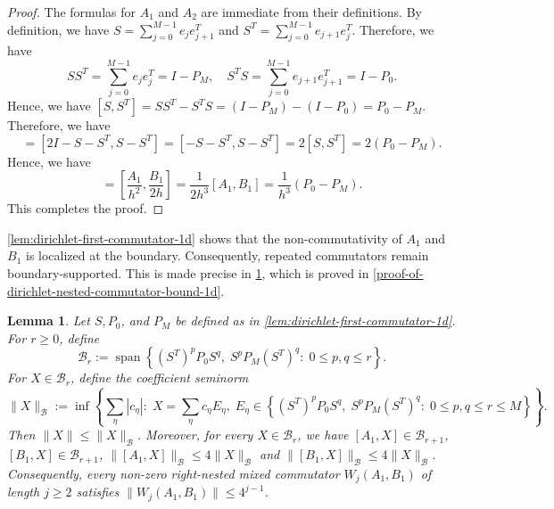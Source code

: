\documentclass[10pt,reqno]{article}
\numberwithin{equation}{section}
\theoremstyle{plain}
\newtheorem{lem}[thm]{Lemma}
\theoremstyle{definition}
\begin{document}
\begin{proof}
The formulas for \(A_1\) and \(A_2\) are immediate from their definitions. By definition, we have $S=\sum_{j=0}^{M-1}e_je_{j+1}^T$ and $S^T=\sum_{j=0}^{M-1}e_{j+1}e_j^T$. Therefore, we have
\begin{equation}
SS^T=\sum_{j=0}^{M-1}e_je_j^T=I-P_M, \quad S^TS=\sum_{j=0}^{M-1}e_{j+1}e_{j+1}^T=I-P_0.
\end{equation}
Hence, we have $ [S,S^T] = SS^T-S^T S = (I-P_M)-(I-P_0) = P_0-P_M$. Therefore, we have
\begin{equation}
[A_1,B_1]=[2I-S-S^T,S-S^T]=[-S-S^T,S-S^T] = 2[S,S^T] = 2(P_0-P_M).
\end{equation}
Hence, we have
\begin{equation}
[-\Delta_{h,1},D_{h,1}]  = \left[\frac{A_1}{h^2},\frac{B_1}{2h}\right] =  \frac{1}{2h^3}[A_1,B_1]  =  \frac{1}{h^3}(P_0-P_M).
\end{equation}
This completes the proof.
\end{proof}

\cref{lem:dirichlet-first-commutator-1d} shows that the non-commutativity of \(A_1\) and \(B_1\) is localized at the boundary. Consequently, repeated commutators remain boundary-supported. This is made precise in \cref{dirichlet-nested-commutator-bound-1d}, which is proved in \cref{proof-of-dirichlet-nested-commutator-bound-1d}.

\begin{lem}\label{dirichlet-nested-commutator-bound-1d}
Let \(S,P_0\), and \(P_M\) be defined as in \cref{lem:dirichlet-first-commutator-1d}. For \(r\geq0\), define
\begin{equation}\label{eq:boundary-layer-space}
\mathcal B_r:=\operatorname{span}\left\{(S^T)^pP_0S^q,\;S^pP_M(S^T)^q:\;0\leq p,q\leq r\right\}.
\end{equation}
For \(X\in\mathcal B_r\), define the coefficient seminorm
\begin{equation}\label{eq:boundary-layer-coefficient-seminorm}
\|X\|_{\mathcal B}:=\inf\left\{\sum_\eta |c_\eta|:\;X=\sum_\eta c_\eta E_\eta,\;E_\eta\in\left\{(S^T)^pP_0S^q,\;S^pP_M(S^T)^q:\;0\leq p,q\leq r \leq M \right\}\right\}.
\end{equation}
Then $\|X\|\leq \|X\|_{\mathcal B}$. Moreover, for every \(X\in\mathcal B_r\), we have $[A_1,X]\in\mathcal B_{r+1}$, $[B_1,X]\in\mathcal B_{r+1}$, $\|[A_1,X]\|_{\mathcal B}\leq4\|X\|_{\mathcal B}$ and $\|[B_1,X]\|_{\mathcal B}\leq4\|X\|_{\mathcal B}$. Consequently, every non-zero right-nested mixed commutator \(W_j(A_1,B_1)\) of length \(j\geq2\) satisfies $\|W_j(A_1,B_1)\|\leq4^{j-1}$. 
\end{lem}
\end{document}
